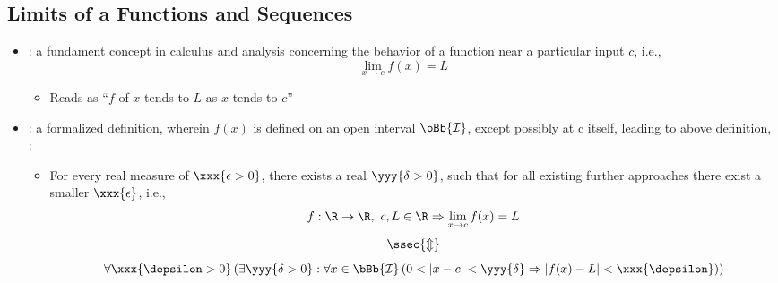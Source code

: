 \begin{itemize}
  \subsection{Limits of a Functions and Sequences}
  \begin{itemize}
    \item {}: a fundament concept in calculus and analysis concerning the behavior of a function near a particular input \(c\), i.e., 
    \[%
    \lim_{x \to c}f(x) = L
    \]%
    \begin{itemize}
      \item Reads as ``\(f\) of \(x\) tends to \(L\) as \(x\) tends to \(c\)''
    \end{itemize}
    \item {}: a formalized definition, wherein \(f(x)\) is defined on an open interval \(\bBb{\mathcal{I}}\), except possibly at  c itself, leading to above definition, :
      \begin{itemize}
        \item For every real measure of  \(\xxx{\epsilon > 0}\), there exists a real  \(\yyy{\delta >0}\), such that for all existing further approaches there exist a smaller \(\xxx{\epsilon}\), i.e.,
        \[%
        f : \R \to \R,~  c, L \in \R \Rightarrow \lim_{x \to c}f(x) = L 
        \]%
        \vspace{-24pt}
        \[%
        \ssec{\Updownarrow}
        \]%
        \[%
        \forall\xxx{\depsilon >0} \left(
          \exists\yyy{\delta >0} : 
            \forall x \in \bBb{\mathcal{I}} \left(
              0 < | x -  c | < \yyy{\delta} 
              \Rightarrow 
              | f(x) - L | < \xxx{\depsilon}
            \right)
        \right)
        \]%
        

\end{itemize}
\end{itemize}
\end{itemize}

